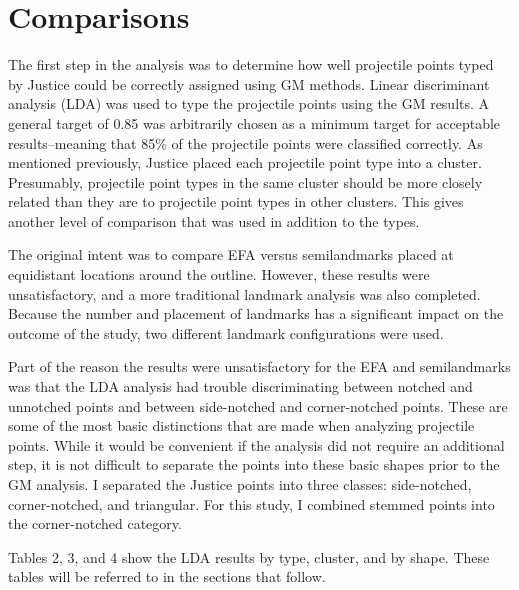 \documentclass[a4paper]{article}
\begin{document}
\hypertarget{comparisons}{%
\section*{Comparisons}\label{comparisons}}

The first step in the analysis was to determine how well projectile points typed by Justice could be correctly assigned using GM methods. Linear discriminant analysis (LDA) was used to type the projectile points using the GM results. A general target of 0.85 was arbitrarily chosen as a minimum target for acceptable results--meaning that 85\% of the projectile points were classified correctly. As mentioned previously, Justice placed each projectile point type into a cluster. Presumably, projectile point types in the same cluster should be more closely related than they are to projectile point types in other clusters. This gives another level of comparison that was used in addition to the types.

The original intent was to compare EFA versus semilandmarks placed at equidistant locations around the outline. However, these results were unsatisfactory, and a more traditional landmark analysis was also completed. Because the number and placement of landmarks has a significant impact on the outcome of the study, two different landmark configurations were used.

Part of the reason the results were unsatisfactory for the EFA and semilandmarks was that the LDA analysis had trouble discriminating between notched and unnotched points and between side-notched and corner-notched points. These are some of the most basic distinctions that are made when analyzing projectile points. While it would be convenient if the analysis did not require an additional step, it is not difficult to separate the points into these basic shapes prior to the GM analysis. I separated the Justice points into three classes: side-notched, corner-notched, and triangular. For this study, I combined stemmed points into the corner-notched category.

Tables 2, 3, and 4 show the LDA results by type, cluster, and by shape. These tables will be referred to in the sections that follow.
\end{document}
